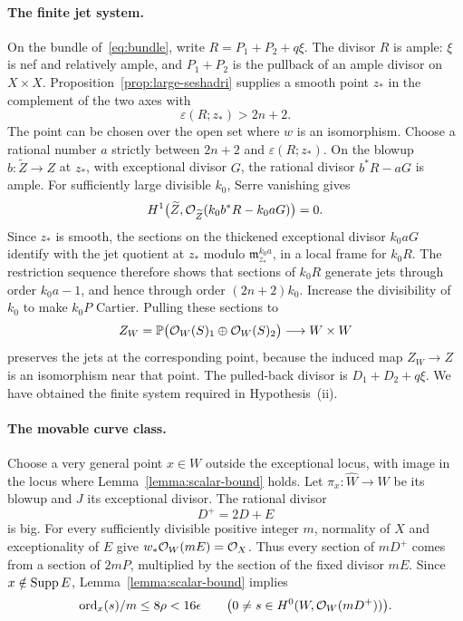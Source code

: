 \paragraph{The finite jet system.}
On the bundle of~\eqref{eq:bundle}, write
$R=P_1+P_2+q\xi$. The divisor $R$ is ample: $\xi$ is nef and
relatively ample, and $P_1+P_2$ is the pullback of an ample
divisor on $X\times X$. Proposition~\ref{prop:large-seshadri} supplies
a smooth point $z_*$ in the complement of the two axes with
\[
 \varepsilon(R;z_*)>2n+2.
\]
The point can be chosen over the open set where $w$ is an
isomorphism. Choose a rational number $a$ strictly between
$2n+2$ and $\varepsilon(R;z_*)$. On the blowup
$b:\widetilde Z\to Z$ at $z_*$, with exceptional divisor $G$,
the rational divisor $b^*R-aG$ is ample. For sufficiently large
divisible $k_0$, Serre vanishing gives
\[
 H^1\bigl(\widetilde Z,
          \mathcal O_{\widetilde Z}(k_0b^*R-k_0aG)\bigr)=0.
\]
Since $z_*$ is smooth, the sections on the thickened exceptional
divisor $k_0aG$ identify with the jet quotient at $z_*$ modulo
$\mathfrak m_{z_*}^{k_0a}$, in a local frame for $k_0R$.
The restriction sequence therefore shows that sections of
$k_0R$ generate jets through order $k_0a-1$, and hence through
order $(2n+2)k_0$. Increase the divisibility of $k_0$ to make
$k_0P$ Cartier. Pulling these sections to
\[
 Z_W=\mathbb P\bigl(\mathcal O_W(S)_1\oplus\mathcal O_W(S)_2\bigr)
       \longrightarrow W\times W
\]
preserves the jets at the corresponding point, because the induced
map $Z_W\to Z$ is an isomorphism near that point. The pulled-back divisor is
$D_1+D_2+q\xi$. We have obtained the finite system required in
Hypothesis~\textup{(ii)}.

\paragraph{The movable curve class.}
Choose a very general point $x\in W$ outside the exceptional locus,
with image in the locus where Lemma~\ref{lemma:scalar-bound}
holds. Let $\pi_x:\widehat W\to W$ be its blowup and $J$ its
exceptional divisor. The rational divisor
\[
 D^+=2D+E
\]
is big. For every sufficiently divisible positive integer $m$,
normality of $X$ and exceptionality of $E$ give
$w_*\mathcal O_W(mE)=\mathcal O_X$. Thus every section of $mD^+$ comes from a
section of $2mP$, multiplied by the section of the fixed divisor
$mE$. Since $x\notin\operatorname{Supp} E$, Lemma~\ref{lemma:scalar-bound}
implies
\begin{equation}\label{fr:application-order}
 \operatorname{ord}_x(s)/m\le8\rho<16\epsilon
 \qquad\bigl(0\ne s\in H^0(W,\mathcal O_W(mD^+))\bigr).
\end{equation}

